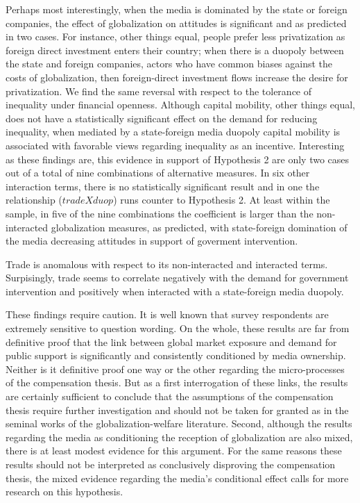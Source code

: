 \documentclass[12pt]{report}
\begin{document}
Perhaps most interestingly, when the media is dominated by the state or foreign companies, the effect of
globalization on attitudes is significant and as predicted in two cases. For instance, other things
equal, people prefer less privatization as foreign direct investment enters their country; when
there is a duopoly between the state and foreign companies, actors who have common biases against
the costs of globalization, then foreign-direct investment flows increase the desire for
privatization. We find the same reversal with respect to the tolerance of inequality under financial
openness. Although capital mobility, other things equal, does not have a statistically significant
effect on the demand for reducing inequality, when mediated by a state-foreign media duopoly capital
mobility is associated with favorable views regarding inequality as an incentive. Interesting as
these findings are, this evidence in support of Hypothesis 2 are only two cases out of a total of
nine combinations of alternative measures. In six other interaction terms, there is no statistically
significant result and in one the relationship ($tradeXduop$) runs counter to Hypothesis 2. At least
within the sample, in five of the nine combinations the coefficient is larger than the non-
interacted globalization measures, as predicted, with state-foreign domination of the media
decreasing attitudes in support of goverment intervention.

	Trade is anomalous with respect to its non-interacted and interacted terms. Surpisingly, trade
	seems to correlate negatively with the demand for government intervention and positively when
	interacted with a state-foreign media duopoly.
	
	These findings require caution. It is well known that survey respondents are extremely sensitive
	to question wording. On the whole, these results are far from definitive proof that the link
	between global market exposure and demand for public support is significantly and consistently
	conditioned by media ownership. Neither is it definitive proof one way or the other regarding
	the micro-processes of the compensation thesis. But as a first interrogation of these links, the
	results are certainly sufficient to conclude that the assumptions of the compensation thesis
	require further investigation and should not be taken for granted as in the seminal works of the
	globalization-welfare literature. Second, although the results regarding the media as
	conditioning the reception of globalization are also mixed, there is at least modest evidence
	for this argument. For the same reasons these results should not be interpreted as conclusively
	disproving the compensation thesis, the mixed evidence regarding the media's conditional effect
	calls for more research on this hypothesis.
	 
\end{document}
